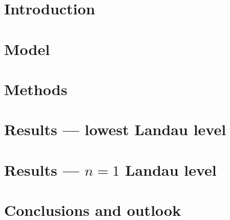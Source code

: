 \documentclass[11pt]{report}
\begin{document}
    \tableofcontents
    \newpage

    \chapter{Introduction}\label{ch:introduction}
    

    \chapter{Model}\label{ch:model}
    

  \chapter{Methods}\label{ch:methods}
    

    \chapter{Results --- lowest Landau level}\label{ch:results}
    

    \chapter{Results --- $n=1$ Landau level}\label{ch:results_1LL}
    

    \chapter{Conclusions and outlook}\label{ch:conclusions}
    
    \newpage

    \printbibliography%

    \newpage
    \appendix
    
\end{document}
